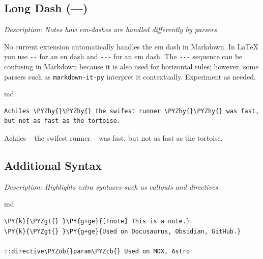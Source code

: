 \documentclass[a4paper,twoside]{article}
\begin{document}
\subsection{Long Dash (---)}\label{long-dash}

\emph{Description: Notes how em-dashes are handled differently by parsers.}

No current extension automatically handles the em dash in Markdown. In \LaTeX{} you use \texttt{-\allowbreak{}-\allowbreak{}} for an en dash and \texttt{-\allowbreak{}-\allowbreak{}-\allowbreak{}} for an em dash. The \texttt{-\allowbreak{}-\allowbreak{}-\allowbreak{}} sequence can be confusing in Markdown because it is also used for horizontal rules; however, some parsers such as \texttt{markdown-\allowbreak{}it-\allowbreak{}py} interpret it contextually. Experiment as needed.

\begin{code}{md}{}{}
\begin{Verbatim}[commandchars=\\\{\},breaklines, breakanywhere, commandchars=\\\{\}]
Achiles \PYZhy{}\PYZhy{} the swifest runner \PYZhy{}\PYZhy{} was fast, but not as fast as the tortoise.
\end{Verbatim}
\end{code}
\begin{displayquote}

Achiles -- the swifest runner -- was fast, but not as fast as the tortoise.

\end{displayquote}
\subsection{Additional Syntax}\label{additional-syntax}

\emph{Description: Highlights extra syntaxes such as callouts and directives.}

\begin{code}{md}{}{}
\begin{Verbatim}[commandchars=\\\{\},breaklines, breakanywhere, commandchars=\\\{\}]
\PY{k}{\PYZgt{} }\PY{g+ge}{[!note] This is a note.}
\PY{k}{\PYZgt{} }\PY{g+ge}{Used on Docusaurus, Obsidian, GitHub.}

::directive\PYZob{}param\PYZcb{} Used on MDX, Astro
\end{Verbatim}
\end{code}
\end{document}
